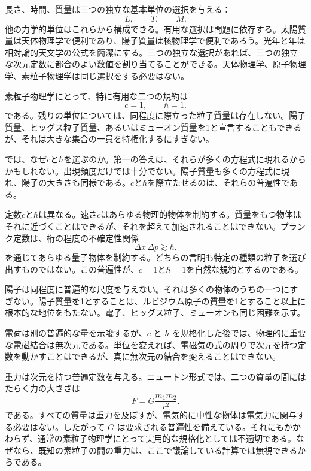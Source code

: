 長さ、時間、質量は三つの独立な基本単位の選択を与える：
\begin{equation}
L,\qquad T,\qquad M.
\end{equation}
他の力学的単位はこれらから構成できる。有用な選択は問題に依存する。太陽質量は天体物理学で便利であり、陽子質量は核物理学で便利であろう。光年と年は相対論的天文学の公式を簡潔にする。三つの独立な選択があれば、三つの独立な次元定数に都合のよい数値を割り当てることができる。天体物理学、原子物理学、素粒子物理学は同じ選択をする必要はない。

素粒子物理学にとって、特に有用な二つの規約は
\begin{equation}
c=1,
\qquad
\hbar=1.
\end{equation}
である。残りの単位については、同程度に際立った粒子質量は存在しない。陽子質量、ヒッグス粒子質量、あるいはミューオン質量を1と宣言することもできるが、それは大きな集合の一員を特権化するにすぎない。

では、なぜ\(c\)と\(\hbar\)を選ぶのか。第一の答えは、それらが多くの方程式に現れるからかもしれない。出現頻度だけでは十分でない。陽子質量も多くの方程式に現れ、陽子の大きさも同様である。\(c\)と\(\hbar\)を際立たせるのは、それらの普遍性である。

定数\(c\)と\(\hbar\)は異なる。速さ\(c\)はあらゆる物理的物体を制約する。質量をもつ物体はそれに近づくことはできるが、それを超えて加速されることはできない。プランク定数は、桁の程度の不確定性関係
\begin{equation}
\Delta x\,\Delta p\gtrsim\hbar.
\end{equation}
を通じてあらゆる量子物体を制約する。どちらの言明も特定の種類の粒子を選び出すものではない。この普遍性が、\(c=1\)と\(\hbar=1\)を自然な規約とするのである。

陽子は同程度に普遍的な尺度を与えない。それは多くの物体のうちの一つにすぎない。陽子質量を1とすることは、ルビジウム原子の質量を1とすること以上に根本的な地位をもたない。電子、ヒッグス粒子、ミューオンも同じ困難を示す。

電荷は別の普遍的な量を示唆するが、\(c\) と \(\hbar\) を規格化した後では、物理的に重要な電磁結合は無次元である。単位を変えれば、電磁気の式の周りで次元を持つ定数を動かすことはできるが、真に無次元の結合を変えることはできない。

重力は次元を持つ普遍定数を与える。ニュートン形式では、二つの質量の間にはたらく力の大きさは
\begin{equation}
F=G\frac{m_1m_2}{r^2}.
\end{equation}
である。すべての質量は重力を及ぼすが、電気的に中性な物体は電気力に関与する必要はない。したがって \(G\) は要求される普遍性を備えている。それにもかかわらず、通常の素粒子物理学にとって実用的な規格化としては不適切である。なぜなら、既知の素粒子の間の重力は、ここで議論している計算では無視できるからである。

